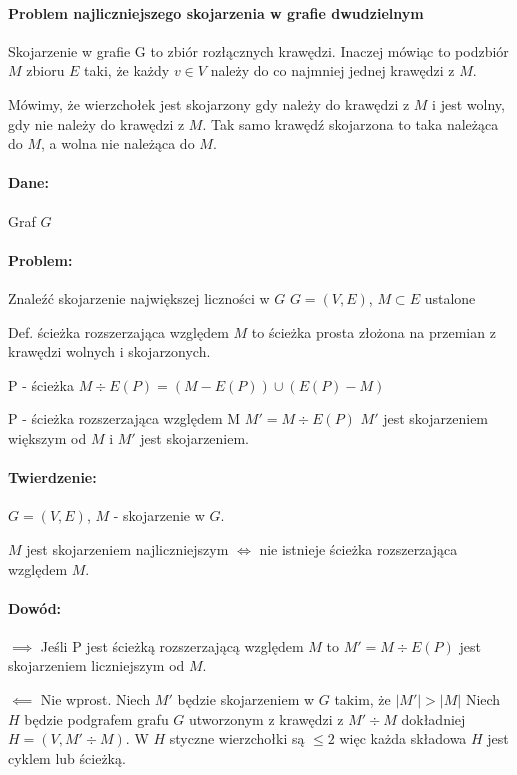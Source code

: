 \paragraph{Problem najliczniejszego skojarzenia w grafie dwudzielnym}
Skojarzenie w grafie G to zbiór rozłącznych krawędzi. Inaczej mówiąc to podzbiór $M$ zbioru $E$ taki, że każdy $v \in V$ należy do co najmniej jednej krawędzi z $M$.

Mówimy, że wierzchołek jest skojarzony gdy należy do krawędzi z $M$ i jest wolny, gdy nie należy do krawędzi z $M$. Tak samo krawędź skojarzona to taka należąca do $M$, a wolna nie należąca do $M$.

\paragraph{Dane:}{Graf $G$}
\paragraph{Problem:}{Znaleźć skojarzenie największej liczności w $G$}
$G = (V,E)$, $M \subset E$ ustalone

Def. ścieżka rozszerzająca względem $M$ to ścieżka prosta złożona na przemian z krawędzi wolnych i skojarzonych.

P - ścieżka 
$M \div E(P) = (M- E(P)) \cup (E(P)-M)$

P - ścieżka rozszerzająca względem M
$M' = M \div E(P)$
$M'$ jest skojarzeniem większym od $M$ i $M'$ jest skojarzeniem.

\paragraph{Twierdzenie:}
$G=(V,E)$, $M$ - skojarzenie w $G$.

$M$ jest skojarzeniem najliczniejszym $\iff$ nie istnieje ścieżka rozszerzająca względem $M$.

\paragraph{Dowód:}
$\implies$ Jeśli P jest ścieżką rozszerzającą względem $M$ to $M' = M \div E(P)$ jest skojarzeniem liczniejszym od $M$.

$\impliedby$ Nie wprost. Niech $M'$ będzie skojarzeniem w $G$ takim, że $|M'| > |M|$
Niech $H$ będzie podgrafem grafu $G$ utworzonym z krawędzi z $M' \div M$ dokładniej $H = (V, M' \div M)$. W $H$ styczne wierzchołki są $\leq 2$ więc każda składowa $H$ jest cyklem lub ścieżką. 

